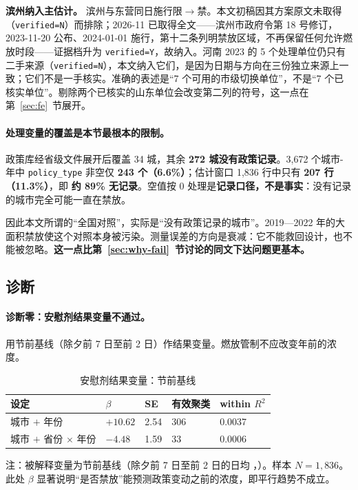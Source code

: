 \noindent\textbf{滨州纳入主估计。} 滨州与东营同日施行限$\rightarrow$禁。本文初稿因其方案原文未取得（\texttt{verified=N}）而排除；2026-11 已取得全文——滨州市政府令第 18 号修订，2023-11-20 公布、2024-01-01 施行，第十二条列明禁放区域，不再保留任何允许燃放时段——证据档升为 \texttt{verified=Y}，故纳入。河南 2023 的 5 个处理单位仍只有二手来源（\texttt{verified=N}），本文纳入它们，是因为日期与方向在三份独立来源上一致；它们不是一手核实。准确的表述是“7 个可用的市级切换单位”，不是“7 个已核实单位”。剔除两个已核实的山东单位会改变第二列的符号，这一点在第~\ref{sec:fe}~节展开。

\paragraph{处理变量的覆盖是本节最根本的限制。}

政策库经省级文件展开后覆盖 34 城，其余 \textbf{272 城没有政策记录}。3,672 个城市-年中 \texttt{policy\_type} 非空仅 \textbf{243 个（6.6\%）}；估计窗口 1,836 行中只有 \textbf{207 行（11.3\%）}，即 \textbf{约 89\% 无记录}。空值按 0 处理是\textbf{记录口径，不是事实}：没有记录的城市完全可能一直在禁放。

因此本文所谓的“全国对照”，实际是“没有政策记录的城市”。2019—2022 年的大面积禁放使这个对照本身被污染。测量误差的方向是衰减：它不能救回设计，也不能被忽略。\textbf{这一点比第~\ref{sec:why-fail}~节讨论的同文下达问题更基本。}

\subsection{诊断}

\paragraph{诊断零：安慰剂结果变量不通过。}

用节前基线（除夕前 7 日至前 2 日）作结果变量。燃放管制不应改变年前的浓度。

\begin{table}[H]
\centering
\caption{安慰剂结果变量：节前基线}
\label{tab:placebo-outcome}
\small
\begin{tabular}{L{4.2cm}R{2.0cm}R{2.0cm}R{2.0cm}R{2.0cm}}
\toprule
\textbf{设定} & $\beta$ & \textbf{SE} & \textbf{有效聚类} & \textbf{within $R^2$} \\
\midrule
城市 $+$ 年份 & $\mathbf{+10.62}$ & 2.54 & 306 & 0.0037 \\
城市 $+$ 省份 $\times$ 年份 & $\mathbf{-4.48}$ & 1.59 & 33 & 0.0006 \\
\bottomrule
\end{tabular}

\vspace{0.3em}
{\small 注：被解释变量为节前基线（除夕前 7 日至前 2 日的日均 ，\ugm）。样本 $N=1{,}836$。此处 $\beta$ 显著说明“是否禁放”能预测政策变动之前的浓度，即平行趋势不成立。}
\end{table}

